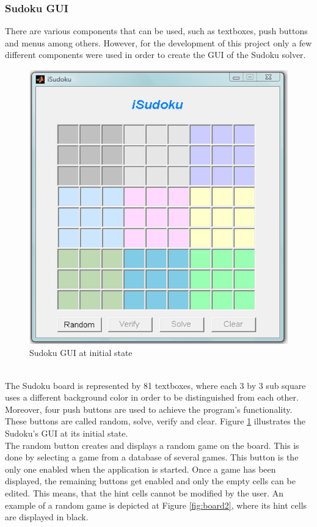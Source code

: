 \documentclass[12pt,a4paper]{article} %
\begin{document}
\subsubsection{Sudoku GUI}
There are various components that can be used, such as textboxes, push buttons and menus among others. However, for the development of this project only a few different components were used in order to create the GUI of the Sudoku solver.
\begin{figure}[h!]
\centering
\includegraphics[scale = 0.7]{pictures/board1}
\caption{Sudoku GUI at initial state}
\label{fig:board1}
\end{figure}
\newline
\\The Sudoku board is represented by 81 textboxes, where each 3 by 3 sub square uses a different background color in order to be distinguished from each other.  Moreover, four push buttons are used to achieve the program’s functionality. These buttons are called random, solve, verify and clear. Figure \ref{fig:board1} illustrates the Sudoku’s GUI at its initial state.
\newline
\\The random button creates and displays a random game on the board. This is done by selecting a game from a database of several games. This button is the only one enabled when the application is started. Once a game has been displayed, the remaining buttons get enabled and only the empty cells can be edited. This means, that the hint cells cannot be modified by the user. An example of a random game is depicted at Figure \ref{fig:board2}, where its hint cells are displayed in black.
\end{document}
